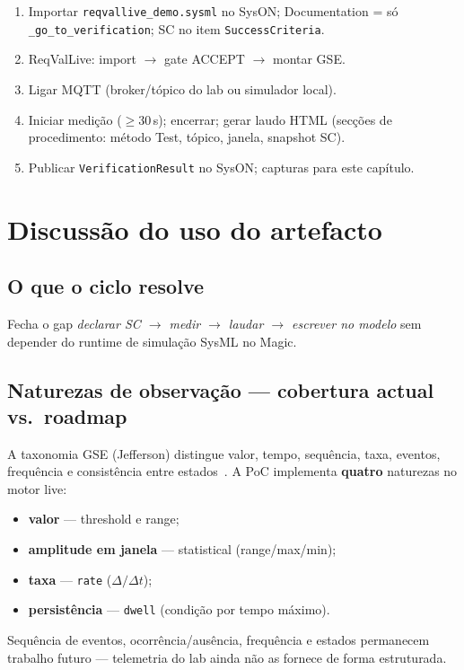 \begin{enumerate}
  \item Importar \texttt{reqvallive\_demo.sysml} no SysON; Documentation =
        só \texttt{\_go\_to\_verification}; SC no item \texttt{SuccessCriteria}.
  \item ReqValLive: import $\rightarrow$ gate ACCEPT $\rightarrow$ montar GSE.
  \item Ligar MQTT (broker/tópico do lab ou simulador local).
  \item Iniciar medição ($\geq$30\,s); encerrar; gerar laudo HTML (secções de
        procedimento: método Test, tópico, janela, snapshot SC).
  \item Publicar \texttt{VerificationResult} no SysON; capturas para este capítulo.
\end{enumerate}

\section{Discussão do uso do artefacto}
\label{sec:discussao}

\subsection{O que o ciclo resolve}

Fecha o gap \emph{declarar SC $\rightarrow$ medir $\rightarrow$ laudar $\rightarrow$
escrever no modelo} sem depender do runtime de simulação SysML no Magic.

\subsection{Naturezas de observação --- cobertura actual vs.\ roadmap}

A taxonomia GSE (Jefferson) distingue valor, tempo, sequência, taxa, eventos,
frequência e consistência entre estados~\cite{jefferson2026gse}.
A PoC implementa \textbf{quatro} naturezas no motor live:
\begin{itemize}
  \item \textbf{valor} --- threshold e range;
  \item \textbf{amplitude em janela} --- statistical (range/max/min);
  \item \textbf{taxa} --- \texttt{rate} ($\Delta/\Delta t$);
  \item \textbf{persistência} --- \texttt{dwell} (condição por tempo máximo).
\end{itemize}
Sequência de eventos, ocorrência/ausência, frequência e estados permanecem
trabalho futuro --- telemetria do lab ainda não as fornece de forma estruturada.

